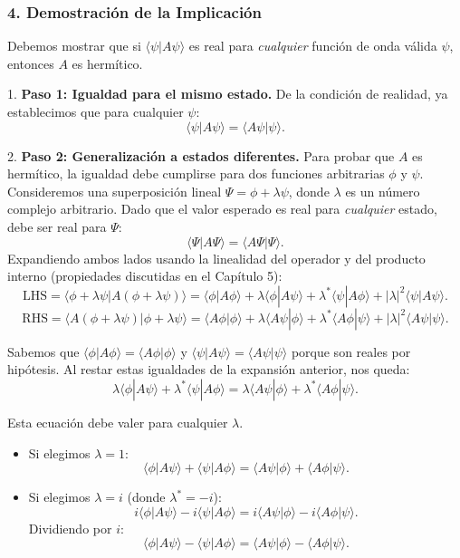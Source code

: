 \documentclass[a4paper]{article}
\begin{document}
\subsubsection{4. Demostración de la Implicación}

Debemos mostrar que si $\langle \psi | A \psi \rangle$ es real para \textit{cualquier} función de onda válida $\psi$, entonces $A$ es hermítico.

1.  \textbf{Paso 1: Igualdad para el mismo estado.}
    De la condición de realidad, ya establecimos que para cualquier $\psi$:
    $$
    \langle \psi | A \psi \rangle = \langle A \psi | \psi \rangle.
    $$

2.  \textbf{Paso 2: Generalización a estados diferentes.}
    Para probar que $A$ es hermítico, la igualdad debe cumplirse para dos funciones arbitrarias $\phi$ y $\psi$. Consideremos una superposición lineal $\Psi = \phi + \lambda \psi$, donde $\lambda$ es un número complejo arbitrario.
    Dado que el valor esperado es real para \textit{cualquier} estado, debe ser real para $\Psi$:
    $$
    \langle \Psi | A \Psi \rangle = \langle A \Psi | \Psi \rangle.
    $$
    Expandiendo ambos lados usando la linealidad del operador y del producto interno (propiedades discutidas en el Capítulo 5):
    $$
    \text{LHS} = \langle \phi + \lambda \psi | A (\phi + \lambda \psi) \rangle = \langle \phi | A \phi \rangle + \lambda \langle \phi | A \psi \rangle + \lambda^* \langle \psi | A \phi \rangle + |\lambda|^2 \langle \psi | A \psi \rangle.
    $$
    $$
    \text{RHS} = \langle A (\phi + \lambda \psi) | \phi + \lambda \psi \rangle = \langle A \phi | \phi \rangle + \lambda \langle A \psi | \phi \rangle + \lambda^* \langle A \phi | \psi \rangle + |\lambda|^2 \langle A \psi | \psi \rangle.
    $$
    
    Sabemos que $\langle \phi | A \phi \rangle = \langle A \phi | \phi \rangle$ y $\langle \psi | A \psi \rangle = \langle A \psi | \psi \rangle$ porque son reales por hipótesis. Al restar estas igualdades de la expansión anterior, nos queda:
    $$
    \lambda \langle \phi | A \psi \rangle + \lambda^* \langle \psi | A \phi \rangle = \lambda \langle A \psi | \phi \rangle + \lambda^* \langle A \phi | \psi \rangle.
    $$
    
    Esta ecuación debe valer para cualquier $\lambda$.
    \begin{itemize}
        \item Si elegimos $\lambda = 1$:
        $$
        \langle \phi | A \psi \rangle + \langle \psi | A \phi \rangle = \langle A \psi | \phi \rangle + \langle A \phi | \psi \rangle.
        $$
        \item Si elegimos $\lambda = i$ (donde $\lambda^* = -i$):
        $$
        i \langle \phi | A \psi \rangle - i \langle \psi | A \phi \rangle = i \langle A \psi | \phi \rangle - i \langle A \phi | \psi \rangle.
        $$
        Dividiendo por $i$:
        $$
        \langle \phi | A \psi \rangle - \langle \psi | A \phi \rangle = \langle A \psi | \phi \rangle - \langle A \phi | \psi \rangle.
        $$
    \end{itemize}
    
\end{document}
